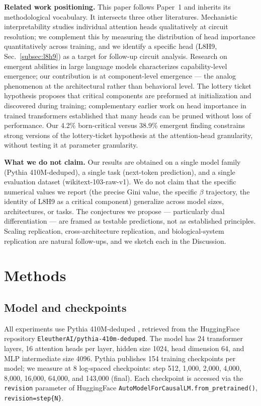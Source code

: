 \documentclass{article}
\begin{document}
\textbf{Related work positioning.} This paper follows Paper~1 and inherits its methodological vocabulary. It intersects three other literatures. Mechanistic interpretability \citep{olsson2022induction, wang2023interpretability, conmy2023automated} studies individual attention heads qualitatively at circuit resolution; we complement this by measuring the distribution of head importance quantitatively across training, and we identify a specific head (L8H9, Sec.~\ref{subsec:l8h9}) as a target for follow-up circuit analysis. Research on emergent abilities in large language models \citep{wei2022emergent} characterizes capability-level emergence; our contribution is at component-level emergence --- the analog phenomenon at the architectural rather than behavioral level. The lottery ticket hypothesis \citep{frankle2019lottery} proposes that critical components are preformed at initialization and discovered during training; complementary earlier work on head importance in trained transformers \citep{michel2019sixteen} established that many heads can be pruned without loss of performance. Our 4.2\% born-critical versus 38.9\% emergent finding constrains strong versions of the lottery-ticket hypothesis at the attention-head granularity, without testing it at parameter granularity.

\textbf{What we do not claim.} Our results are obtained on a single model family (Pythia 410M-deduped), a single task (next-token prediction), and a single evaluation dataset (wikitext-103-raw-v1). We do not claim that the specific numerical values we report (the precise Gini value, the specific $\beta$ trajectory, the identity of L8H9 as a critical component) generalize across model sizes, architectures, or tasks. The conjectures we propose --- particularly dual differentiation --- are framed as testable predictions, not as established principles. Scaling replication, cross-architecture replication, and biological-system replication are natural follow-ups, and we sketch each in the Discussion.

\section{Methods}
\label{sec:methods}

\subsection{Model and checkpoints}

All experiments use Pythia 410M-deduped \citep{biderman2023pythia}, retrieved from the HuggingFace repository \texttt{EleutherAI/pythia-410m-deduped}. The model has 24 transformer layers, 16 attention heads per layer, hidden size 1024, head dimension 64, and MLP intermediate size 4096. Pythia publishes 154 training checkpoints per model; we measure at 8 log-spaced checkpoints: step 512, 1,000, 2,000, 4,000, 8,000, 16,000, 64,000, and 143,000 (final). Each checkpoint is accessed via the \texttt{revision} parameter of HuggingFace \texttt{AutoModelForCausalLM.from\_pretrained()}, \texttt{revision=step\{N\}}.
\end{document}
